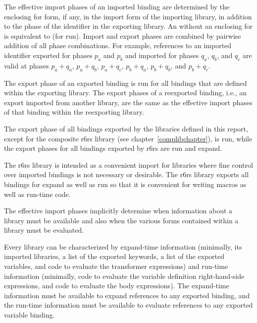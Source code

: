 The effective import phases of an imported binding are determined by the enclosing
{\cf for} form, if any, in the {\cf import} form of the importing
library, in addition to the phase of the identifier in the exporting library.
An  without an enclosing {\cf for} is equivalent to
{\cf (for  run)}.
Import and export phases are combined by pairwise addition of all phase
combinations.  For example, references to an imported identifier exported
for phases $p_a$ and $p_b$ and imported for phases $q_a$, $q_b$, and $q_c$
are valid at phases $p_a+q_a$, $p_a+q_b$, $p_a+q_c$, $p_b+q_a$, $p_b+q_b$,
and $p_b+q_c$.

The export phase of an exported binding is {\cf run} for all bindings
that are defined within the exporting library. The export phases of a
reexported binding, i.e., an export imported from another library, are the
same as the effective import phases of that binding within the reexporting
library.

The export phase of all bindings exported by the libraries defined in this
report, except for the composite {\cf r6rs} library
(see chapter~\ref{complibchapter}), is {\cf run}, while
the export phases for all bindings exported by {\cf r6rs} are {\cf run}
and {\cf expand}.

\begin{rationale} 
The {\cf r6rs} library is intended as a convenient import for libraries where fine
control over imported bindings is not necessary or desirable. The {\cf r6rs} library
exports all bindings for {\cf expand} as well as {\cf run} so that it is convenient
for writing macros as well as run-time code.
\end{rationale}

The effective import phases implicitly determine when information about a
library must be available and also when the various forms contained within
a library must be evaluated.

Every library can be characterized by expand-time information (minimally,
its imported libraries, a list of the exported keywords, a list of the
exported variables, and code to evaluate the transformer expressions) and
run-time information (minimally, code to evaluate the variable definition
right-hand-side expressions, and code to evaluate the body expressions).
The expand-time information must be available to expand references to
any exported binding, and the run-time information must be available to
evaluate references to any exported variable binding.

